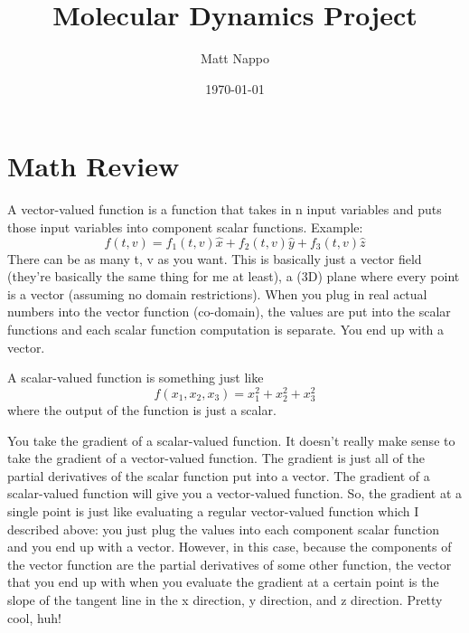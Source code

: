 \documentclass{article}
\title{Molecular Dynamics Project}
\author{Matt Nappo}
\date{\today}
\begin{document}
\section{Math Review}

A vector-valued function is a function that takes in n input variables and puts those input variables into component scalar functions. Example: $$f(t, v) = f_1(t, v)\hat x + f_2(t, v)\hat y + f_3(t, v)\hat z$$ There can be as many t, v as you want. This is basically just a vector field (they're basically the same thing for me at least), a (3D) plane where every point is a vector (assuming no domain restrictions). When you plug in real actual numbers into the vector function (co-domain), the values are put into the scalar functions and each scalar function computation is separate. You end up with a vector.

A scalar-valued function is something just like $$f(x_1, x_2, x_3) = x_1^2 + x_2^2 + x_3^2$$ where the output of the function is just a scalar.

You take the gradient of a scalar-valued function. It doesn't really make sense to take the gradient of a vector-valued function. The gradient is just all of the partial derivatives of the scalar function put into a vector. The gradient of a scalar-valued function will give you a vector-valued function. So, the gradient at a single point is just like evaluating a regular vector-valued function which I described above: you just plug the values into each component scalar function and you end up with a vector. However, in this case, because the components of the vector function are the partial derivatives of some other function, the vector that you end up with when you evaluate the gradient at a certain point is the slope of the tangent line in the x direction, y direction, and z direction. Pretty cool, huh!
\end{document}
